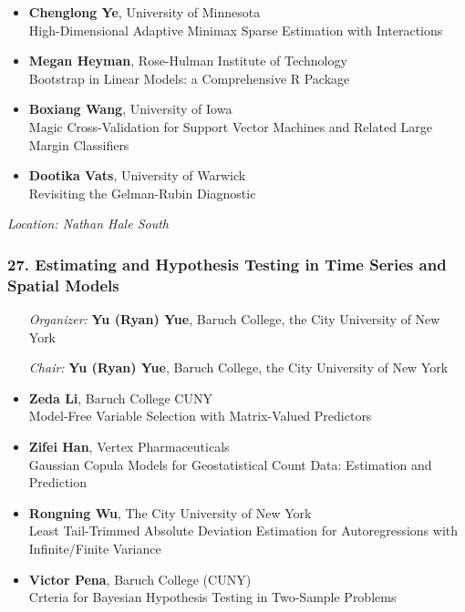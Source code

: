 \begin{itemize}
\item \textbf{Chenglong Ye}, University of Minnesota \\
High-Dimensional Adaptive Minimax Sparse Estimation with Interactions
\item \textbf{Megan Heyman}, Rose-Hulman Institute of Technology \\
Bootstrap in Linear Models:  a Comprehensive R Package
\item \textbf{Boxiang Wang}, University of Iowa \\
Magic Cross-Validation for Support Vector Machines and Related Large Margin Classifiers
\item \textbf{Dootika Vats}, University of Warwick \\
Revisiting the Gelman-Rubin Diagnostic
\end{itemize}

\emph{Location: Nathan Hale South}

\subsubsection*{27. Estimating and Hypothesis Testing in Time Series and Spatial Models}

\begin{enumerate}[align=left]
\item [\emph{Organizer:}] \textbf{Yu (Ryan) Yue}, Baruch College, the City University of New York
\item [\emph{Chair:}] \textbf{Yu (Ryan) Yue}, Baruch College, the City University of New York
\end{enumerate}

\begin{itemize}
\item \textbf{Zeda Li}, Baruch College CUNY \\
Model-Free Variable Selection with Matrix-Valued Predictors
\item \textbf{Zifei Han}, Vertex Pharmaceuticals \\
Gaussian Copula Models for Geostatistical Count Data: Estimation and Prediction
\item \textbf{Rongning Wu}, The City University of New York \\
Least Tail-Trimmed Absolute Deviation Estimation for Autoregressions with Infinite/Finite Variance
\item \textbf{Victor Pena}, Baruch College (CUNY) \\
Crteria for Bayesian Hypothesis Testing in Two-Sample Problems
\end{itemize}

